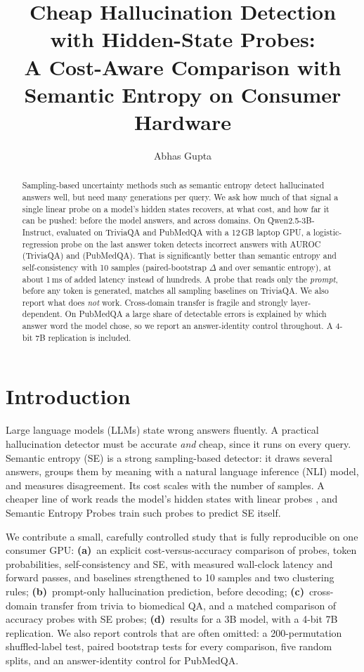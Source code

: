 \documentclass[10pt,twocolumn]{article}
\title{\Large\bfseries Cheap Hallucination Detection with Hidden-State Probes:\\
A Cost-Aware Comparison with Semantic Entropy on Consumer Hardware}
\author{Abhas Gupta}
\date{}
\begin{document}
\maketitle

\begin{abstract}
Sampling-based uncertainty methods such as semantic entropy detect hallucinated answers
well, but need many generations per query. We ask how much of that signal a
single linear probe on a model's hidden states recovers, at what cost, and how far it
can be pushed: before the model answers, and across domains. On Qwen2.5-3B-Instruct,
evaluated on TriviaQA and PubMedQA with a 12\,GB laptop GPU, a logistic-regression
probe on the last answer token detects incorrect answers with AUROC \TqAucProbeAns{}
(TriviaQA) and \PmAucProbeAns{} (PubMedQA). That is significantly better than semantic entropy and
self-consistency with 10 samples (paired-bootstrap $\Delta$ \TqDProbeAnsvsSEten{} and
\PmDProbeAnsvsSEten{} over semantic entropy), at about 1\,ms of added latency instead of
hundreds. A probe that reads only the \emph{prompt}, before any token is generated,
matches all sampling baselines on TriviaQA. We also report what does \emph{not} work.
Cross-domain transfer is fragile and strongly layer-dependent. On PubMedQA a large share
of detectable errors is explained by which answer word the model chose, so we report an
answer-identity control throughout. A 4-bit 7B replication is included.
\end{abstract}

\section{Introduction}
Large language models (LLMs) state wrong answers fluently. A practical hallucination
detector must be accurate \emph{and} cheap, since it runs on every query.
Semantic entropy (SE) \citep{kuhn2023semantic,farquhar2024detecting} is a strong
sampling-based detector: it draws several answers, groups them by meaning with a natural
language inference (NLI) model, and measures disagreement. Its cost scales with the
number of samples. A cheaper line of work reads the model's hidden states with linear
probes \citep{azaria2023internal,kadavath2022language,marks2024geometry}, and
Semantic Entropy Probes \citep{kossen2024sep} train such probes to predict SE itself.

We contribute a small, carefully controlled study that is fully reproducible on one
consumer GPU:
\textbf{(a)}~an explicit cost-versus-accuracy comparison of probes, token probabilities,
self-consistency and SE, with measured wall-clock latency and forward passes, and baselines
strengthened to 10 samples and two clustering rules;
\textbf{(b)}~prompt-only hallucination prediction, before decoding;
\textbf{(c)}~cross-domain transfer from trivia to biomedical QA, and a matched comparison of
accuracy probes with SE probes;
\textbf{(d)}~results for a 3B model, with a 4-bit 7B replication.
We also report controls that are often omitted: a 200-permutation shuffled-label test,
paired bootstrap tests for every comparison, five random splits, and an answer-identity
control for PubMedQA.
\end{document}
